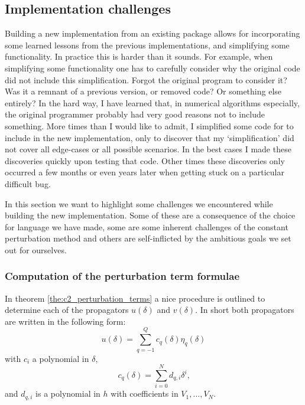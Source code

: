 \subsection{Implementation challenges}

Building a new implementation from an existing package allows for incorporating some learned lessons from the previous implementations, and simplifying some functionality.  In practice this is harder than it sounds. For example, when simplifying some functionality one has to carefully consider why the original code did not include this simplification. Forgot the original program to consider it? Was it a remnant of a previous version, or removed code? Or something else entirely? In the hard way, I have learned that, in numerical algorithms especially, the original programmer probably had very good reasons not to include something. More times than I would like to admit, I simplified some code for  to include in the new implementation, only to discover that my `simplification' did not cover all edge-cases or all possible scenarios. In the best cases I made these discoveries quickly upon testing that code. Other times these discoveries only occurred a few months or even years later when getting stuck on a particular difficult bug.

In this section we want to highlight some challenges we encountered while building the new implementation. Some of these are a consequence of the choice for language we have made, some are some inherent challenges of the constant perturbation method and others are self-inflicted by the ambitious goals we set out for ourselves.



\subsubsection{Computation of the perturbation term formulae}

In theorem \ref{the:c2_perturbation_terms} a nice procedure is outlined to determine each of the propagators $u(\delta)$ and $v(\delta)$. In short both propagators are written in the following form:
$$
    u(\delta) = \sum_{q = -1}^{Q} c_q(\delta) \eta_{q}(\delta)
$$
with $c_i$ a polynomial in $\delta$,
\begin{equation}\label{equ:c2_symbolic_propagators}
    c_q(\delta)  = \sum_{i=0}^{N} d_{q, i} \delta^i\text{,}
\end{equation}
and $d_{q, i}$ is a polynomial in $h$ with coefficients in $V_1, \dots, V_{N}$.

